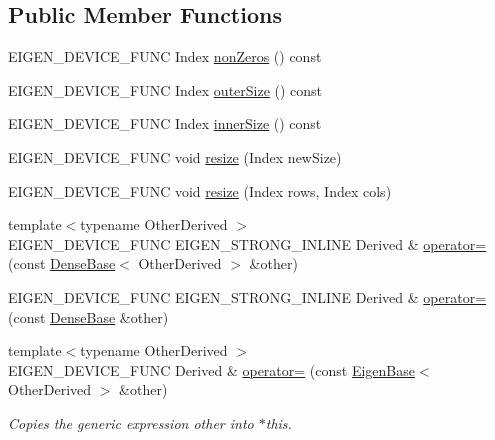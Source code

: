 \subsection*{Public Member Functions}
\begin{DoxyCompactItemize}
\item 
E\+I\+G\+E\+N\+\_\+\+D\+E\+V\+I\+C\+E\+\_\+\+F\+U\+NC Index \mbox{\hyperlink{class_eigen_1_1_dense_base_ad5c2c3a2cfa0bb931dcc0743b9f57882}{non\+Zeros}} () const
\item 
E\+I\+G\+E\+N\+\_\+\+D\+E\+V\+I\+C\+E\+\_\+\+F\+U\+NC Index \mbox{\hyperlink{class_eigen_1_1_dense_base_ad78fff11f12aefa46318ae88b6efcc50}{outer\+Size}} () const
\item 
E\+I\+G\+E\+N\+\_\+\+D\+E\+V\+I\+C\+E\+\_\+\+F\+U\+NC Index \mbox{\hyperlink{class_eigen_1_1_dense_base_a57c6f5516aa86d4c22f382f1a069a319}{inner\+Size}} () const
\item 
E\+I\+G\+E\+N\+\_\+\+D\+E\+V\+I\+C\+E\+\_\+\+F\+U\+NC void \mbox{\hyperlink{class_eigen_1_1_dense_base_a13027a493a68a13496610caf3d81bd3e}{resize}} (Index new\+Size)
\item 
E\+I\+G\+E\+N\+\_\+\+D\+E\+V\+I\+C\+E\+\_\+\+F\+U\+NC void \mbox{\hyperlink{class_eigen_1_1_dense_base_aef40c2ee48a85a799270c8258cc12b76}{resize}} (Index rows, Index cols)
\item 
{\footnotesize template$<$typename Other\+Derived $>$ }\\E\+I\+G\+E\+N\+\_\+\+D\+E\+V\+I\+C\+E\+\_\+\+F\+U\+NC E\+I\+G\+E\+N\+\_\+\+S\+T\+R\+O\+N\+G\+\_\+\+I\+N\+L\+I\+NE Derived \& \mbox{\hyperlink{class_eigen_1_1_dense_base_a581a7a353bd007b5352f11688e3bc5fa}{operator=}} (const \mbox{\hyperlink{class_eigen_1_1_dense_base}{Dense\+Base}}$<$ Other\+Derived $>$ \&other)
\item 
E\+I\+G\+E\+N\+\_\+\+D\+E\+V\+I\+C\+E\+\_\+\+F\+U\+NC E\+I\+G\+E\+N\+\_\+\+S\+T\+R\+O\+N\+G\+\_\+\+I\+N\+L\+I\+NE Derived \& \mbox{\hyperlink{class_eigen_1_1_dense_base_aae79d5d0d95e60bf2e64d0dc3dfd66a4}{operator=}} (const \mbox{\hyperlink{class_eigen_1_1_dense_base}{Dense\+Base}} \&other)
\item 
{\footnotesize template$<$typename Other\+Derived $>$ }\\E\+I\+G\+E\+N\+\_\+\+D\+E\+V\+I\+C\+E\+\_\+\+F\+U\+NC Derived \& \mbox{\hyperlink{class_eigen_1_1_dense_base_a6462697d5a6fa3104f5f1213fdf9ff12}{operator=}} (const \mbox{\hyperlink{struct_eigen_1_1_eigen_base}{Eigen\+Base}}$<$ Other\+Derived $>$ \&other)
\begin{DoxyCompactList}\small\item\em Copies the generic expression {\itshape other} into $\ast$this. \end{DoxyCompactList}\item 

\end{DoxyCompactItemize}
